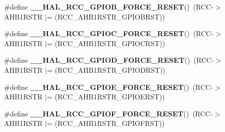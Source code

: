 \begin{DoxyCompactItemize}
\item 
\mbox{\label{group___r_c_c_ex___force___release___peripheral___reset_ga3b89be9638638ffce3ebd4f08a3b64cf}} 
\#define {\bfseries \+\_\+\+\_\+\+H\+A\+L\+\_\+\+R\+C\+C\+\_\+\+G\+P\+I\+O\+B\+\_\+\+F\+O\+R\+C\+E\+\_\+\+R\+E\+S\+ET}()~(R\+CC-\/$>$A\+H\+B1\+R\+S\+TR $\vert$= (R\+C\+C\+\_\+\+A\+H\+B1\+R\+S\+T\+R\+\_\+\+G\+P\+I\+O\+B\+R\+ST))
\item 
\mbox{\label{group___r_c_c_ex___force___release___peripheral___reset_ga6e6a20fa8e0d7b3ebfdce26f6b1a1ed0}} 
\#define {\bfseries \+\_\+\+\_\+\+H\+A\+L\+\_\+\+R\+C\+C\+\_\+\+G\+P\+I\+O\+C\+\_\+\+F\+O\+R\+C\+E\+\_\+\+R\+E\+S\+ET}()~(R\+CC-\/$>$A\+H\+B1\+R\+S\+TR $\vert$= (R\+C\+C\+\_\+\+A\+H\+B1\+R\+S\+T\+R\+\_\+\+G\+P\+I\+O\+C\+R\+ST))
\item 
\mbox{\label{group___r_c_c_ex___force___release___peripheral___reset_gaf0f7c49787fc94edeea74aa4218aeaf6}} 
\#define {\bfseries \+\_\+\+\_\+\+H\+A\+L\+\_\+\+R\+C\+C\+\_\+\+G\+P\+I\+O\+D\+\_\+\+F\+O\+R\+C\+E\+\_\+\+R\+E\+S\+ET}()~(R\+CC-\/$>$A\+H\+B1\+R\+S\+TR $\vert$= (R\+C\+C\+\_\+\+A\+H\+B1\+R\+S\+T\+R\+\_\+\+G\+P\+I\+O\+D\+R\+ST))
\item 
\mbox{\label{group___r_c_c_ex___force___release___peripheral___reset_ga00bf47b2dc642a42de9c96477db2a2c3}} 
\#define {\bfseries \+\_\+\+\_\+\+H\+A\+L\+\_\+\+R\+C\+C\+\_\+\+G\+P\+I\+O\+E\+\_\+\+F\+O\+R\+C\+E\+\_\+\+R\+E\+S\+ET}()~(R\+CC-\/$>$A\+H\+B1\+R\+S\+TR $\vert$= (R\+C\+C\+\_\+\+A\+H\+B1\+R\+S\+T\+R\+\_\+\+G\+P\+I\+O\+E\+R\+ST))
\item 
\mbox{\label{group___r_c_c_ex___force___release___peripheral___reset_gaddfca42e493e7c163e9decf0462183df}} 
\#define {\bfseries \+\_\+\+\_\+\+H\+A\+L\+\_\+\+R\+C\+C\+\_\+\+G\+P\+I\+O\+F\+\_\+\+F\+O\+R\+C\+E\+\_\+\+R\+E\+S\+ET}()~(R\+CC-\/$>$A\+H\+B1\+R\+S\+TR $\vert$= (R\+C\+C\+\_\+\+A\+H\+B1\+R\+S\+T\+R\+\_\+\+G\+P\+I\+O\+F\+R\+ST))
\item 
\mbox{\label{group___r_c_c_ex___force___release___peripheral___reset_gaf9d186d1ede1071931d87645bddb07d0}} 

\end{DoxyCompactItemize}
